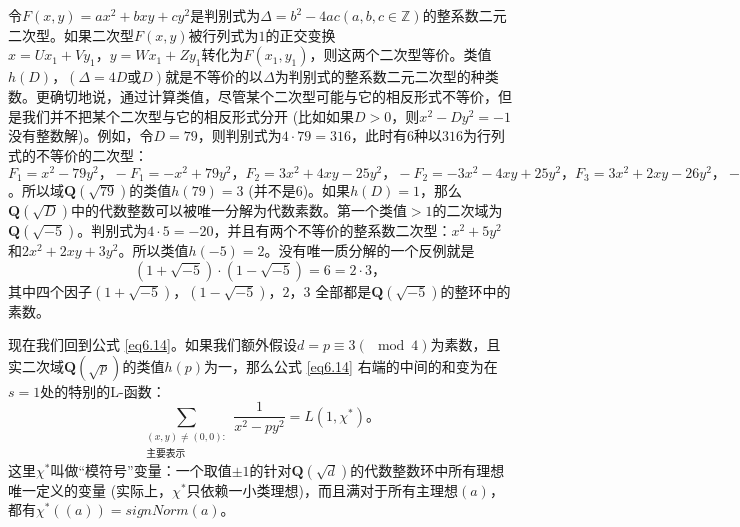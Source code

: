 \documentclass[11pt,a4paper]{article}
\theoremstyle{definition}
\newcommand{\refeq}[1]{公式 \ref{#1}}
\numberwithin{equation}{section}
\newcommand{\comma}{\text{，}}
\newcommand{\juhao}{\text{。}}
\newcommand{\qfield}[1]{$ \mathbf{Q}\left(\sqrt{#1}\right) $}%
\begin{document}
令$ F\left(x,y\right)=ax^{2}+bxy+cy^{2} $是判别式为$ \Delta=b^{2}-4ac\left(a,b,c\in\mathbb{Z}\right) $的整系数二元二次型。如果二次型$F\left(x,y\right)  $被行列式为$ 1 $的正交变换$ x=Ux_{1}+Vy_{1}\comma y=Wx_{1}+Zy_{1} $转化为$  F\left(x_{1},y_{1}\right)  $，则这两个二次型等价。类值$ h\left(D\right)\comma(\Delta=4D\text{或}D) $就是不等价的以$ \Delta  $为判别式的整系数二元二次型的种类数。更确切地说，通过计算类值，尽管某个二次型可能与它的相反形式不等价，但是我们并不把某个二次型与它的相反形式分开 (比如如果$ D>0  $，则$ x^{2}-Dy^{2}=-1 $没有整数解)。例如，令$ D=79  $，则判别式为$  4\cdot79=316 $，此时有$ 6 $种以$ 316 $为行列式的不等价的二次型：$ F_{1}=x^{2}-79y^{2}\comma -F_{1}=-x^{2}+79y^{2}\comma F_{2}=3x^{2}+4xy-25y^{2}\comma -F_{2}=-3x^{2}-4xy+25y^{2}\comma F_{3}=3x^{2}+2xy-26y^{2}\comma -F_{3}=-3x^{2}-2xy+26y^{2} $。所以域\qfield{79}的类值$h\left(79\right) =3 $ (并不是$ 6 $)。如果$ h\left(D\right)=1 $，那么$ \mathbf{Q}\left(\sqrt{D}\right) $中的代数整数可以被唯一分解为代数素数。第一个类值$ >1 $的二次域为$ \mathbf{Q}\left(\sqrt{-5}\right) $。判别式为$ 4\cdot5=-20 $，并且有两个不等价的整系数二次型：$ x^{2}+5y^{2} $和$ 2x^{2}+2xy+3y^{2} $。所以类值$ h\left(-5\right)=2 $。没有唯一质分解的一个反例就是
 \[ \left(1+\sqrt{-5}\right)\cdot\left(1-\sqrt{-5}\right) =6=2\cdot3\comma\]
 其中四个因子$ \left(1+\sqrt{-5}\right)\text{，}\left(1-\sqrt{-5}\right) \text{，}2\text{，}3 $ 全部都是$ \mathbf{Q}\left(\sqrt{-5}\right) $的整环中的素数。
 
 现在我们回到\refeq{eq6.14}。如果我们额外假设$ d=p\equiv3\left(\!\!\mod4\right) $为素数，且实二次域$ \mathbf{Q}\left(\sqrt{p}\right) $的类值$ h\left(p\right) $为一，那么\refeq{eq6.14} 右端的中间的和变为在$ s=1 $处的特别的L-函数：
 \begin{equation} \label{eq6.15}
 	\sum_{\substack{\left(x,y\right)\neq\left(0,0\right):\\\text{主要表示}}}\dfrac{1}{x^{2}-py^{2}}=L\left(1,\chi^{\ast}\right)\juhao
 \end{equation}
 这里$ \chi^{\ast} $叫做``模符号''变量：一个取值$ \pm1 $的针对$ \mathbf{Q}\left(\sqrt{d}\right) $的代数整数环中所有理想唯一定义的变量 (实际上，$ \chi^{\ast} $只依赖一小类理想)，而且满对于所有主理想$ \left(a\right) $，都有$  \chi^{\ast}\left(\left(a\right)\right)=sign Norm\left(a\right)$。
 
\end{document}
